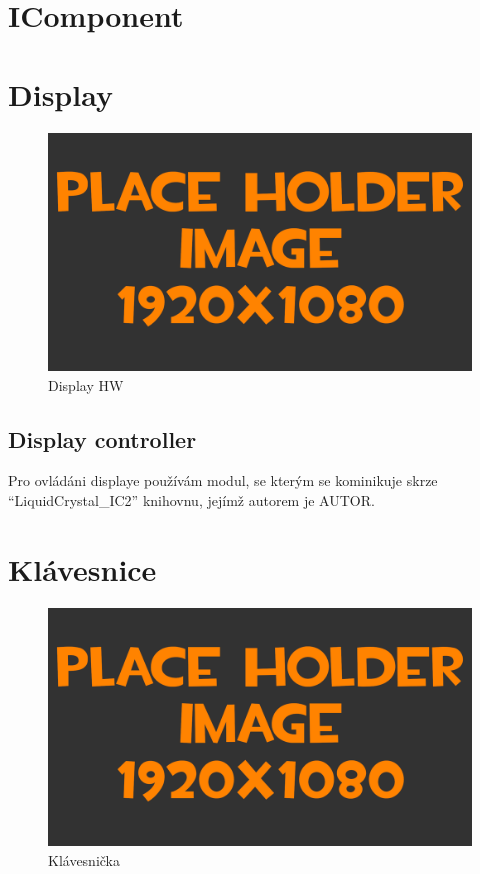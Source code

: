 
\section{IComponent}


\newpage
\section{Display}
\begin{figure}[h!]
	\centering
	\includegraphics[width=\textwidth]{pictures/placeHolderFHD.png}
    	\caption{Display HW}
   	\label{fig:displayHW}
\end{figure}

\newpage
\subsection{Display controller}

Pro ovládáni displaye používám modul, se kterým se kominikuje skrze “LiquidCrystal\_IC2” knihovnu, jejímž autorem je AUTOR.

\section{Klávesnice}
\begin{figure}[h!]
	\centering
	\includegraphics[width=\textwidth]{pictures/placeHolderFHD.png}
    	\caption{Klávesnička}
   	\label{fig:keyborad}
\end{figure}

